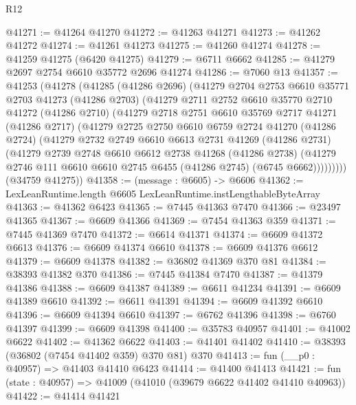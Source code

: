 \begin{lexlean}{R12}
\begin{coremodule}
@41271 := @41264 @41270
@41272 := @41263 @41271
@41273 := @41262 @41272
@41274 := @41261 @41273
@41275 := @41260 @41274
@41278 := @41259 @41275 (@6420 @41275)
@41279 := @6711 @6662
@41285 := @41279 @2697 @2754 @6610 @35772 @2696 @41274
@41286 := @7060 @13
@41357 := @41253
    (@41278
      (@41285
        (@41286 @2696)
        (@41279
          @2704
          @2753
          @6610
          @35771
          @2703
          @41273
          (@41286 @2703)
          (@41279
            @2711
            @2752
            @6610
            @35770
            @2710
            @41272
            (@41286 @2710)
            (@41279
              @2718
              @2751
              @6610
              @35769
              @2717
              @41271
              (@41286 @2717)
              (@41279
                @2725
                @2750
                @6610
                @6759
                @2724
                @41270
                (@41286 @2724)
                (@41279
                  @2732
                  @2749
                  @6610
                  @6613
                  @2731
                  @41269
                  (@41286 @2731)
                  (@41279
                    @2739
                    @2748
                    @6610
                    @6612
                    @2738
                    @41268
                    (@41286 @2738)
                    (@41279 @2746 @111 @6610 @6610 @2745 @6455 (@41286 @2745) (@6745 @6662)))))))))
      (@34759 @41275))
@41358 := (message : @6605) -> @6606
@41362 := LexLeanRuntime.length @6605 LexLeanRuntime.instLengthableByteArray
@41363 := @41362 @6423
@41365 := @7445 @41363 @7470
@41366 := @23497 @41365
@41367 := @6609 @41366
@41369 := @7454 @41363 @359
@41371 := @7445 @41369 @7470
@41372 := @6614 @41371
@41374 := @6609 @41372 @6613
@41376 := @6609 @41374 @6610
@41378 := @6609 @41376 @6612
@41379 := @6609 @41378
@41382 := @36802 @41369 @370 @81
@41384 := @38393 @41382 @370
@41386 := @7445 @41384 @7470
@41387 := @41379 @41386
@41388 := @6609 @41387
@41389 := @6611 @41234
@41391 := @6609 @41389 @6610
@41392 := @6611 @41391
@41394 := @6609 @41392 @6610
@41396 := @6609 @41394 @6610
@41397 := @6762 @41396
@41398 := @6760 @41397
@41399 := @6609 @41398
@41400 := @35783 @40957
@41401 := @41002 @6622
@41402 := @41362 @6622
@41403 := @41401 @41402
@41410 := @38393 (@36802 (@7454 @41402 @359) @370 @81) @370
@41413 := fun (__p0 : @40957) => @41403 @41410 @6423
@41414 := @41400 @41413
@41421 := fun (state : @40957) => @41009 (@41010 (@39679 @6622 @41402 @41410 @40963))
@41422 := @41414 @41421

\end{coremodule}
\end{lexlean}
